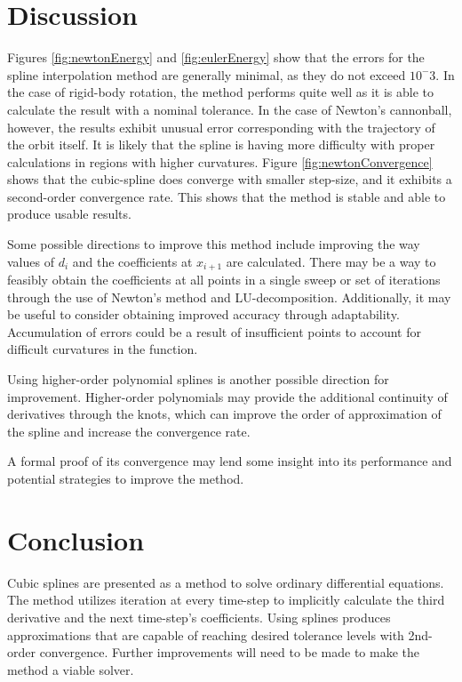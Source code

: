 \documentclass{article}
\begin{document}
\section{Discussion}\label{sec:disc}

Figures \ref{fig:newtonEnergy} and \ref{fig:eulerEnergy} show that the errors for the spline interpolation method are generally minimal, as they do not exceed $10^-3$. In the case of rigid-body rotation, the method performs quite well as it is able to calculate the result with a nominal tolerance. In the case of Newton's cannonball, however, the results exhibit unusual error corresponding with the trajectory of the orbit itself. It is likely that the spline is having more difficulty with proper calculations in regions with higher curvatures. Figure \ref{fig:newtonConvergence} shows that the cubic-spline does converge with smaller step-size, and it exhibits a second-order convergence rate. This shows that the method is stable and able to produce usable results.


Some possible directions to improve this method include improving the way values of $d_i$ and the coefficients at $x_{i+1}$ are calculated. There may be a way to feasibly obtain the coefficients at all points in a single sweep or set of iterations through the use of Newton's method and LU-decomposition. Additionally, it may be useful to consider obtaining improved accuracy through adaptability. Accumulation of errors could be a result of insufficient points to account for difficult curvatures in the function.

Using higher-order polynomial splines is another possible direction for improvement. Higher-order polynomials may provide the additional continuity of derivatives through the knots, which can improve the order of approximation of the spline and increase the convergence rate. 

A formal proof of its convergence may lend some insight into its performance and potential strategies to improve the method. 

\section{Conclusion}
Cubic splines are presented as a method to solve ordinary differential equations. The method utilizes iteration at every time-step to implicitly calculate the third derivative and the next time-step's coefficients. Using splines produces approximations that are capable of reaching desired tolerance levels with 2nd-order convergence. Further improvements will need to be made to make the method a viable solver.
\end{document}
